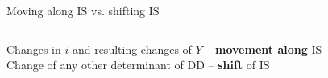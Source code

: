 \documentclass{beamer}
\newcommand{\tb}[1]{{\color{blue}{\textbf{#1}}}}
\begin{document}
%
%
%
%	
%
%
\begin{frame}{Moving along IS vs. shifting IS}
    \begin{columns}
Changes in $i$ and resulting changes of $Y$ -- \textbf{movement along} IS \\
\vspace{0.5cm}
Change of any other determinant of DD -- \textbf{shift} of IS 
\vspace{0.5cm}
\end{columns}
\end{frame}
\end{document}
